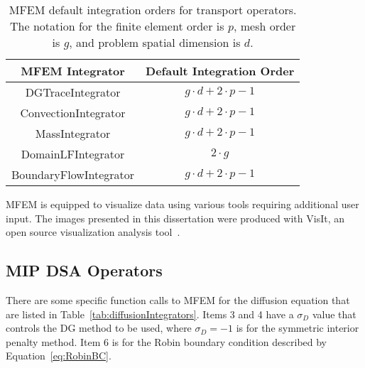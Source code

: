 \documentclass{article}
\begin{document}
\begin{table}[!h]
\centering
{\renewcommand{\arraystretch}{2}
\begin{tabular}{|c|c|}
\hline
\multicolumn{1}{|c}{\textbf{MFEM Integrator}} & \multicolumn{1}{|c|}{\textbf{Default Integration Order}} \\
\hline \hline
DGTraceIntegrator & $g \cdot d + 2 \cdot p - 1$ \\
\hline
ConvectionIntegrator & $g \cdot d + 2 \cdot p - 1$ \\
\hline
MassIntegrator & $g \cdot d + 2 \cdot p - 1$ \\
\hline
DomainLFIntegrator & $2 \cdot g$ \\
\hline
BoundaryFlowIntegrator & $g \cdot d + 2 \cdot p - 1$ \\
\hline
\end{tabular}}
\caption{MFEM default integration orders for transport operators. The notation for the finite element order is $p$, mesh order is $g$, and problem spatial dimension is $d$.}
\label{tab:integrationOrders}
\end{table}

MFEM is equipped to visualize data using various tools requiring additional user input. The images presented in this dissertation were produced with VisIt, an open source visualization analysis tool~\cite{VisIt_Web}.

\subsection{MIP DSA Operators}
\label{sub:MIPDSAOperators}
There are some specific function calls to MFEM for the diffusion equation that are listed in Table~\ref{tab:diffusionIntegrators}. Items 3 and 4 have a $\sigma_D$ value that controls the DG method to be used, where $\sigma_D = -1$ is for the symmetric interior penalty method. Item 6 is for the Robin boundary condition described by Equation~\ref{eq:RobinBC}.
\end{document}
